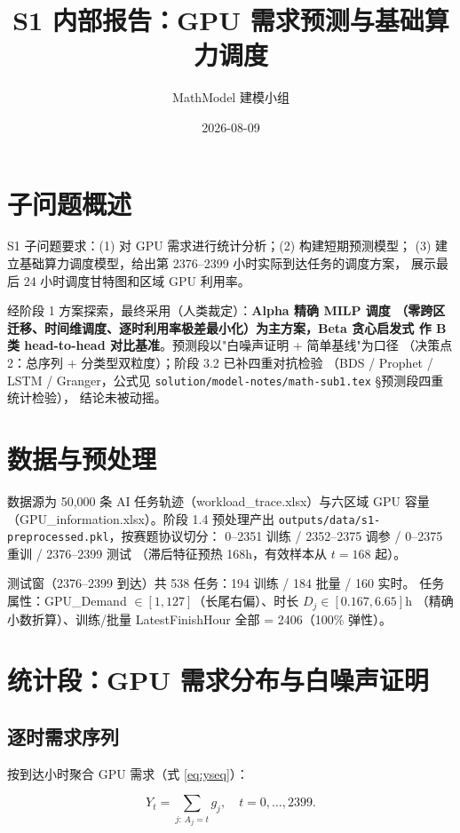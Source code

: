 \documentclass{internal-report}
\title{S1 内部报告：GPU 需求预测与基础算力调度}
\author{MathModel 建模小组}
\date{2026-08-09}
\begin{document}
\maketitle

\section{子问题概述}

S1 子问题要求：(1) 对 GPU 需求进行统计分析；(2) 构建短期预测模型；
(3) 建立基础算力调度模型，给出第 2376--2399 小时实际到达任务的调度方案，
展示最后 24 小时调度甘特图和区域 GPU 利用率。

经阶段 1 方案探索，最终采用（人类裁定）：\textbf{Alpha 精确 MILP 调度
（零跨区迁移、时间维调度、逐时利用率极差最小化）为主方案，Beta 贪心启发式
作 B 类 head-to-head 对比基准}。预测段以"白噪声证明 + 简单基线"为口径
（决策点 2：总序列 + 分类型双粒度）；阶段 3.2 已补四重对抗检验
（BDS / Prophet / LSTM / Granger，公式见
\texttt{solution/model-notes/math-sub1.tex} \S 预测段四重统计检验），
结论未被动摇。

\section{数据与预处理}

数据源为 50{,}000 条 AI 任务轨迹（workload\_trace.xlsx）与六区域 GPU 容量
（GPU\_information.xlsx）。阶段 1.4 预处理产出
\texttt{outputs/data/s1-preprocessed.pkl}，按赛题协议切分：
0--2351 训练 / 2352--2375 调参 / 0--2375 重训 / 2376--2399 测试
（滞后特征预热 168h，有效样本从 $t=168$ 起）。

测试窗（2376--2399 到达）共 538 任务：194 训练 / 184 批量 / 160 实时。
任务属性：GPU\_Demand $\in[1,127]$（长尾右偏）、时长 $D_j \in[0.167,6.65]$h
（精确小数折算）、训练/批量 LatestFinishHour 全部 = 2406（100\% 弹性）。

\section{统计段：GPU 需求分布与白噪声证明}

\subsection{逐时需求序列}

按到达小时聚合 GPU 需求（式 \ref{eq:yseq}）：

\begin{equation}
  Y_t = \sum_{j:\, A_j = t} g_j,\quad t = 0,\ldots,2399.
  \label{eq:yseq}
\end{equation}
\end{document}
